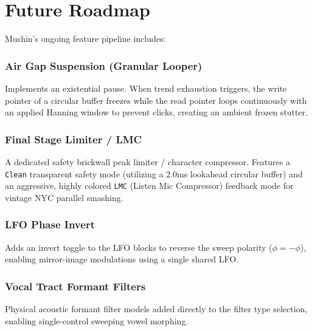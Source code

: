 \documentclass[11pt,a4paper,oneside]{book}
\begin{document}
\chapter{Future Roadmap}

Mushin's ongoing feature pipeline includes:

\subsection{Air Gap Suspension (Granular Looper)}
Implements an existential pause. When trend exhaustion triggers, the write pointer of a circular buffer freezes while the read pointer loops continuously with an applied Hanning window to prevent clicks, creating an ambient frozen stutter.

\subsection{Final Stage Limiter / LMC}
A dedicated safety brickwall peak limiter / character compressor. Features a \texttt{Clean} transparent safety mode (utilizing a 2.0ms lookahead circular buffer) and an aggressive, highly colored \texttt{LMC} (Listen Mic Compressor) feedback mode for vintage NYC parallel smashing.

\subsection{LFO Phase Invert}
Adds an invert toggle to the LFO blocks to reverse the sweep polarity ($\phi = -\phi$), enabling mirror-image modulations using a single shared LFO.

\subsection{Vocal Tract Formant Filters}
Physical acoustic formant filter models added directly to the filter type selection, enabling single-control sweeping vowel morphing.
\end{document}
